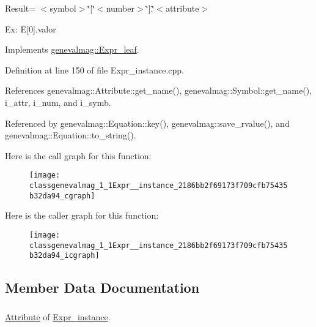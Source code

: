 Result= $<$symbol$>$\char`\"{}\mbox{[}\char`\"{}$<$number$>$\char`\"{}\mbox{]}.\char`\"{}$<$attribute$>$

Ex: E\mbox{[}0\mbox{]}.valor 

Implements \hyperlink{classgenevalmag_1_1Expr__leaf_96854f59a155b173b6e79007d87bdad5}{genevalmag::Expr\_\-leaf}.

Definition at line 150 of file Expr\_\-instance.cpp.

References genevalmag::Attribute::get\_\-name(), genevalmag::Symbol::get\_\-name(), i\_\-attr, i\_\-num, and i\_\-symb.

Referenced by genevalmag::Equation::key(), genevalmag::save\_\-rvalue(), and genevalmag::Equation::to\_\-string().

Here is the call graph for this function:\nopagebreak
\begin{figure}[H]
\begin{center}
\leavevmode
\texttt{[image: classgenevalmag\_1\_1Expr\_\_instance\_2186bb2f69173f709cfb75435b32da94\_cgraph]}
\end{center}
\end{figure}


Here is the caller graph for this function:\nopagebreak
\begin{figure}[H]
\begin{center}
\leavevmode
\texttt{[image: classgenevalmag\_1\_1Expr\_\_instance\_2186bb2f69173f709cfb75435b32da94\_icgraph]}
\end{center}
\end{figure}


\subsection{Member Data Documentation}
\hypertarget{classgenevalmag_1_1Expr__instance_3513fb59dae64c17da188dc3ad10fc53}{
\subsubsection[{i\_\-attr}]{}}
\label{classgenevalmag_1_1Expr__instance_3513fb59dae64c17da188dc3ad10fc53}


\hyperlink{classgenevalmag_1_1Attribute}{Attribute} of \hyperlink{classgenevalmag_1_1Expr__instance}{Expr\_\-instance}. 



